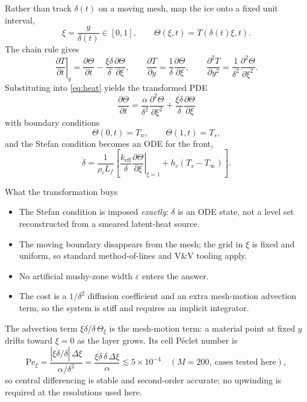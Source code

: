 \documentclass[11pt,a4paper]{article}
\newcommand{\pd}[2]{\frac{\partial #1}{\partial #2}}
\newcommand{\Ts}{T_s}
\newcommand{\Tw}{T_w}
\newcommand{\Tinf}{T_\infty}
\newcommand{\Lf}{L_f}
\newcommand{\keff}{k_{\mathrm{eff}}}
\begin{document}
Rather than track $\delta(t)$ on a moving mesh, map the ice onto a fixed unit interval,
\begin{equation}
  \xi=\frac{y}{\delta(t)}\in[0,1],
  \qquad \Theta(\xi,t)=T(\delta(t)\xi,t).
\end{equation}
The chain rule gives
\begin{equation}
  \left.\pd{T}{t}\right|_y
  =\pd{\Theta}{t}-\frac{\xi\dot\delta}{\delta}\pd{\Theta}{\xi},
  \qquad
  \pd{T}{y}=\frac1\delta\pd{\Theta}{\xi},
  \qquad
  \pd{^2T}{y^2}=\frac1{\delta^2}\pd{^2\Theta}{\xi^2}.
\end{equation}
Substituting into \eqref{eq:heat} yields the transformed PDE
\begin{equation}\label{eq:transformed}
  \boxed{\;\pd{\Theta}{t}
  =\frac{\alpha}{\delta^2}\pd{^2\Theta}{\xi^2}
   +\frac{\xi\dot\delta}{\delta}\pd{\Theta}{\xi}\;}
\end{equation}
with boundary conditions
\begin{equation}
  \Theta(0,t)=\Tw,\qquad \Theta(1,t)=\Ts,
\end{equation}
and the Stefan condition becomes an ODE for the front,
\begin{equation}\label{eq:frontode}
  \boxed{\;\dot\delta
  =\frac{1}{\rho_i\Lf}\left[
     \frac{\keff}{\delta}\left.\pd{\Theta}{\xi}\right|_{\xi=1}
     +h_c\left(\Ts-\Tinf\right)\right].\;}
\end{equation}

\begin{insightbox}{What the transformation buys}
\begin{itemize}[leftmargin=1.2em,itemsep=2pt]
  \item The Stefan condition is imposed \emph{exactly}: $\delta$ is an ODE state, not a
        level set reconstructed from a smeared latent-heat source.
  \item The moving boundary disappears from the mesh; the grid in $\xi$ is fixed and
        uniform, so standard method-of-lines and V\&V tooling apply.
  \item No artificial mushy-zone width $\varepsilon$ enters the answer.
  \item The cost is a $1/\delta^2$ diffusion coefficient and an extra mesh-motion
        advection term, so the system is stiff and requires an implicit integrator.
\end{itemize}
\end{insightbox}

The advection term $\xi\dot\delta/\delta\,\Theta_\xi$ is the mesh-motion term: a material
point at fixed $y$ drifts toward $\xi=0$ as the layer grows. Its cell P\'eclet number is
\begin{equation}
  \mathrm{Pe}_\xi
  =\frac{|\xi\dot\delta/\delta|\,\Delta\xi}{\alpha/\delta^2}
  =\frac{\xi\dot\delta\,\delta\,\Delta\xi}{\alpha}
  \lesssim 5\times10^{-4}\quad (M=200,\ \text{cases tested here}),
\end{equation}
so central differencing is stable and second-order accurate; no upwinding is required at
the resolutions used here.
\end{document}
